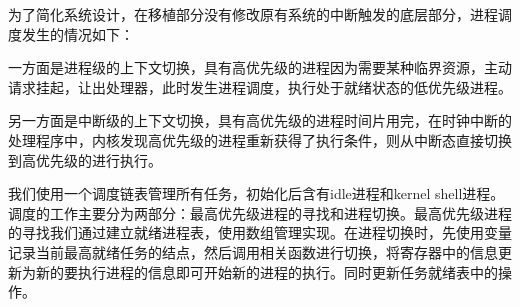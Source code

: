 为了简化系统设计，在移植部分没有修改原有系统的中断触发的底层部分，进程调度发生的情况如下：

一方面是进程级的上下文切换，具有高优先级的进程因为需要某种临界资源，主动请求挂起，让出处理器，此时发生进程调度，执行处于就绪状态的低优先级进程。

另一方面是中断级的上下文切换，具有高优先级的进程时间片用完，在时钟中断的处理程序中，内核发现高优先级的进程重新获得了执行条件，则从中断态直接切换到高优先级的进行执行。

我们使用一个调度链表管理所有任务，初始化后含有idle进程和kernel shell进程。调度的工作主要分为两部分：最高优先级进程的寻找和进程切换。最高优先级进程的寻找我们通过建立就绪进程表，使用数组管理实现。在进程切换时，先使用变量记录当前最高就绪任务的结点，然后调用相关函数进行切换，将寄存器中的信息更新为新的要执行进程的信息即可开始新的进程的执行。同时更新任务就绪表中的操作。



